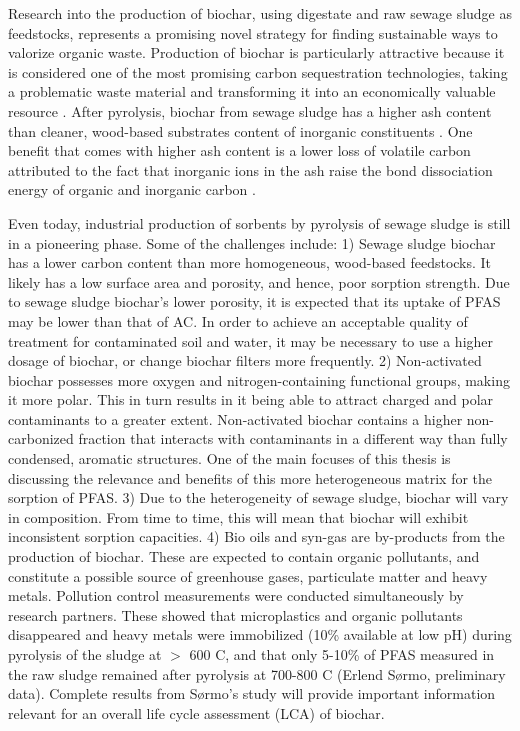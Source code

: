Research into the production of biochar, using digestate and raw sewage sludge as feedstocks, represents a promising novel strategy for finding sustainable ways to valorize organic waste. Production of biochar is particularly attractive because it is considered one of the most promising carbon sequestration technologies, taking a problematic waste material and transforming it into an economically valuable resource \citep{arvaniti2014sorption}. After pyrolysis, biochar from sewage sludge has a higher ash content than cleaner, wood-based substrates content of inorganic constituents \citep{fan2020using}. One benefit that comes with higher ash content is a lower loss of volatile carbon attributed to the fact that inorganic ions in the ash raise the bond dissociation energy of organic and inorganic carbon \citep{Cantrell2012}. 

Even today, industrial production of sorbents by pyrolysis of sewage sludge is still in a pioneering phase. Some of the challenges include: 1) Sewage sludge biochar has a lower carbon content than more homogeneous, wood-based feedstocks. It likely has a low surface area and porosity, and hence, poor sorption strength. Due to sewage sludge biochar's lower porosity, it is expected that its uptake of PFAS may be lower than that of AC. In order to achieve an acceptable quality of treatment for contaminated soil and water, it may be necessary to use a higher dosage of biochar, or change  biochar filters more frequently. 2) Non-activated biochar possesses more oxygen and nitrogen-containing functional groups, making it more polar. This in turn results in it being able to attract charged and polar contaminants to a greater extent. Non-activated biochar contains a higher non-carbonized fraction that interacts with contaminants in a different way than fully condensed, aromatic structures. One of the main focuses of this thesis is discussing the relevance and benefits of this more heterogeneous matrix for the sorption of PFAS. 3) Due to the heterogeneity of sewage sludge, biochar will vary in composition. From time to time, this will mean that biochar will exhibit inconsistent sorption capacities. 4) Bio oils and syn-gas are by-products from the production of biochar. These are expected to contain organic pollutants, and constitute a possible source of greenhouse gases, particulate matter and heavy metals. Pollution control measurements were conducted simultaneously by research partners. These showed that microplastics and organic pollutants disappeared and heavy metals were immobilized (10\% available at low pH) during pyrolysis of the sludge at $>$ 600 \textdegree C, and that only 5-10\% of PFAS measured in the raw sludge remained after pyrolysis at 700-800 \textdegree C (Erlend S\o rmo, preliminary data). Complete results from S\o rmo's study will provide important information relevant for an overall life cycle assessment (\acrshort{LCA}) of biochar.

